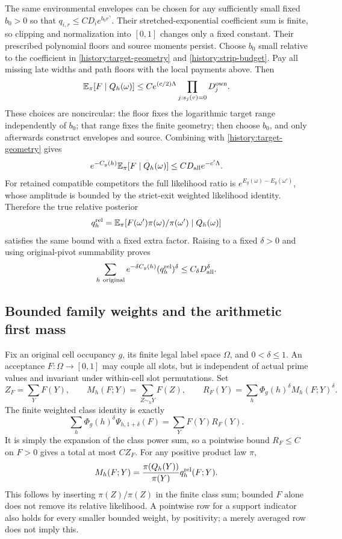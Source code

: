 The same environmental envelopes can be chosen for any sufficiently
small fixed $b_0>0$ so that
$q_{i,r}\le CD_i e^{b_0r^\gamma}$. Their stretched-exponential
coefficient sum is finite, so clipping and normalization into $[0,1]$
changes only a fixed constant. Their prescribed polynomial floors and
source moments persist. Choose $b_0$ small relative to the coefficient
in \eqref{history:target-geometry} and
\eqref{history:strip-budget}. Pay all missing late widths and path
floors with the local payments above. Then
\[
 \mathbb E_\pi[F\mid Q_h(\omega)]
 \le C e^{(c/2)\Lambda}\prod_{j:s_j(v)=0}D_j^{\rm own}.
\]
These choices are noncircular: the floor fixes the logarithmic target
range independently of $b_0$; that range fixes the finite geometry;
then choose $b_0$, and only afterwards construct envelopes and source.
Combining with \eqref{history:target-geometry} gives
\[
 e^{-C_y(h)}\mathbb E_\pi[F\mid Q_h(\omega)]
                      \le CD_{\rm all}e^{-c'\Lambda}.
\]
For retained compatible competitors the full likelihood ratio is
$e^{E_y(\omega)-E_y(\omega')}$, whose amplitude is bounded by the
strict-exit weighted likelihood identity. Therefore the true relative
posterior
\[
 q_h^{\rm rel}=\mathbb E_\pi
       [F(\omega')\pi(\omega)/\pi(\omega')\mid Q_h(\omega)]
\]
satisfies the same bound with a fixed extra factor. Raising to a fixed
$\delta>0$ and using original-pivot summability proves
\begin{equation}
 \sum_{h\ {\rm original}}e^{-\delta C_y(h)}(q_h^{\rm rel})^\delta
                              \le C_\delta D_{\rm all}^{\delta}.
 \label{history:full-row}
\end{equation}

\subsection{Bounded family weights and the arithmetic first mass}

Fix an original cell occupancy $g$, its finite legal label space
$\Omega$, and $0<\delta\le1$. An acceptance $F:\Omega\to[0,1]$
may couple all slots, but is independent of actual prime values and
invariant under within-cell slot permutations. Set
\[
 Z_F=\sum_YF(Y),\qquad
 M_h(F;Y)=\sum_{Z\sim_hY}F(Z),\qquad
 R_F(Y)=\sum_h\Phi_g(h)^\delta M_h(F;Y)^\delta.
\]
The finite weighted class identity is exactly
\begin{equation}
 \sum_h\Phi_g(h)^\delta\Psi_{h,1+\delta}(F)
                =\sum_YF(Y)R_F(Y).
 \label{history:weighted-class-identity}
\end{equation}
It is simply the expansion of the class power sum, so a pointwise
bound $R_F\le C$ on $F>0$ gives a total at most $CZ_F$. For any
positive product law $\pi$,
\[
 M_h(F;Y)=\frac{\pi(Q_h(Y))}{\pi(Y)}q_h^{\rm rel}(F;Y).
\]
This follows by inserting $\pi(Z)/\pi(Z)$ in the finite class sum;
bounded $F$ alone does not remove its relative likelihood. A pointwise
row for a support indicator also holds for every smaller bounded
weight, by positivity; a merely averaged row does not imply this.

